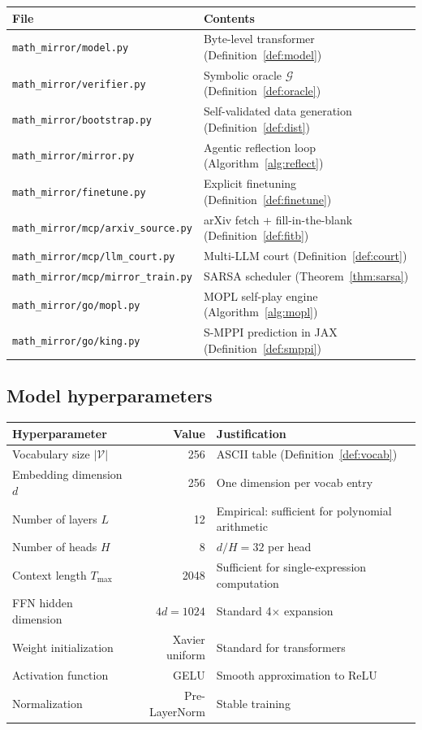 \documentclass[11pt,a4paper]{article}
\newcommand{\cV}{\mathcal{V}}
\newcommand{\cG}{\mathcal{G}}
\begin{document}
\begin{center}
\small
\begin{tabular}{@{}ll@{}}
\toprule
\textbf{File} & \textbf{Contents} \\
\midrule
\texttt{math\_mirror/model.py} & Byte-level transformer (Definition~\ref{def:model}) \\
\texttt{math\_mirror/verifier.py} & Symbolic oracle $\cG$ (Definition~\ref{def:oracle}) \\
\texttt{math\_mirror/bootstrap.py} & Self-validated data generation (Definition~\ref{def:dist}) \\
\texttt{math\_mirror/mirror.py} & Agentic reflection loop (Algorithm~\ref{alg:reflect}) \\
\texttt{math\_mirror/finetune.py} & Explicit finetuning (Definition~\ref{def:finetune}) \\
\texttt{math\_mirror/mcp/arxiv\_source.py} & arXiv fetch + fill-in-the-blank (Definition~\ref{def:fitb}) \\
\texttt{math\_mirror/mcp/llm\_court.py} & Multi-LLM court (Definition~\ref{def:court}) \\
\texttt{math\_mirror/mcp/mirror\_train.py} & SARSA scheduler (Theorem~\ref{thm:sarsa}) \\
\texttt{math\_mirror/go/mopl.py} & MOPL self-play engine (Algorithm~\ref{alg:mopl}) \\
\texttt{math\_mirror/go/king.py} & S-MPPI prediction in JAX (Definition~\ref{def:smppi}) \\
\bottomrule
\end{tabular}
\end{center}

\subsection{Model hyperparameters}

\begin{center}
\small
\begin{tabular}{@{}lrl@{}}
\toprule
\textbf{Hyperparameter} & \textbf{Value} & \textbf{Justification} \\
\midrule
Vocabulary size $|\cV|$ & 256 & ASCII table (Definition~\ref{def:vocab}) \\
Embedding dimension $d$ & 256 & One dimension per vocab entry \\
Number of layers $L$ & 12 & Empirical: sufficient for polynomial arithmetic \\
Number of heads $H$ & 8 & $d/H = 32$ per head \\
Context length $T_{\max}$ & 2048 & Sufficient for single-expression computation \\
FFN hidden dimension & $4d = 1024$ & Standard 4$\times$ expansion \\
Weight initialization & Xavier uniform & Standard for transformers \\
Activation function & GELU & Smooth approximation to ReLU \\
Normalization & Pre-LayerNorm & Stable training \\
\bottomrule
\end{tabular}
\end{center}
\end{document}
